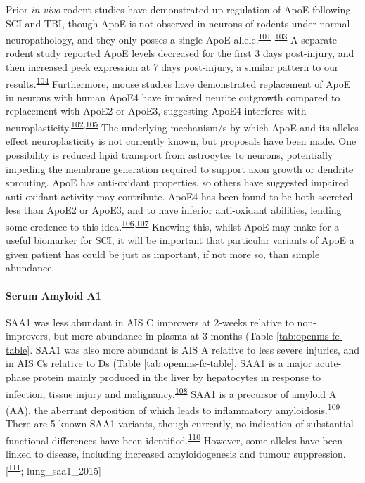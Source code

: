 \documentclass[
]{article}
\begin{document}
Prior \emph{in vivo} rodent studies have demonstrated up-regulation of ApoE following SCI and TBI, though ApoE is not observed in neurons of rodents under normal neuropathology, and they only posses a single ApoE allele.\textsuperscript{\protect\hyperlink{ref-iwata_traumatic_2005}{101}--\protect\hyperlink{ref-mahley_apolipoprotein_2006}{103}}
A separate rodent study reported ApoE levels decreased for the first 3 days post-injury, and then increased peek expression at 7 days post-injury, a similar pattern to our results.\textsuperscript{\protect\hyperlink{ref-yang_apolipoprotein_2018}{104}}
Furthermore, mouse studies have demonstrated replacement of ApoE in neurons with human ApoE4 have impaired neurite outgrowth compared to replacement with ApoE2 or ApoE3, suggesting ApoE4 interferes with neuroplasticity.\textsuperscript{\protect\hyperlink{ref-seitz_apolipoprotein_2003}{102},\protect\hyperlink{ref-white_impaired_2001}{105}}
The underlying mechanism/s by which ApoE and its alleles effect neuroplasticity is not currently known, but proposals have been made.
One possibility is reduced lipid transport from astrocytes to neurons, potentially impeding the membrane generation required to support axon growth or dendrite sprouting.
ApoE has anti-oxidant properties, so others have suggested impaired anti-oxidant activity may contribute.
ApoE4 has been found to be both secreted less than ApoE2 or ApoE3, and to have inferior anti-oxidant abilities, lending some credence to this idea.\textsuperscript{\protect\hyperlink{ref-mishra_inflammation_2018}{106},\protect\hyperlink{ref-miyata_apolipoprotein_1996}{107}}
Knowing this, whilst ApoE may make for a useful biomarker for SCI, it will be important that particular variants of ApoE a given patient has could be just as important, if not more so, than simple abundance.

\hypertarget{serum-amyloid-a1}{%
\paragraph{Serum Amyloid A1}\label{serum-amyloid-a1}}

SAA1 was less abundant in AIS C improvers at 2-weeks relative to non-improvers, but more abundance in plasma at 3-months (Table \ref{tab:openms-fc-table}.
SAA1 was also more abundant is AIS A relative to less severe injuries, and in AIS Cs relative to Ds (Table \ref{tab:openms-fc-table}.
SAA1 is a major acute-phase protein mainly produced in the liver by hepatocytes in response to infection, tissue injury and malignancy.\textsuperscript{\protect\hyperlink{ref-sun_serum_2016}{108}}
SAA1 is a precursor of amyloid A (AA), the aberrant deposition of which leads to inflammatory amyloidosis.\textsuperscript{\protect\hyperlink{ref-tape_direct_1988}{109}}
There are 5 known SAA1 variants, though currently, no indication of substantial functional differences have been identified.\textsuperscript{\protect\hyperlink{ref-lu_structural_2014}{110}}
However, some alleles have been linked to disease, including increased amyloidogenesis and tumour suppression.{[}\textsuperscript{\protect\hyperlink{ref-van_der_hilst_increased_2008}{111}}; lung\_saa1\_2015{]}
\end{document}
